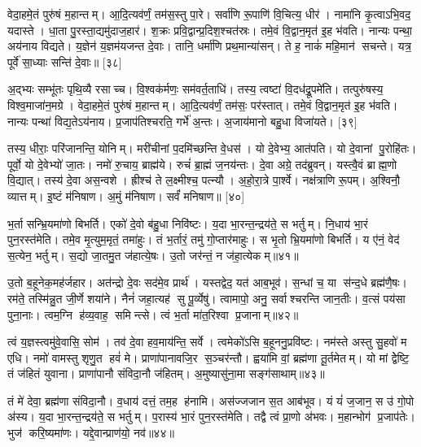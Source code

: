 वेदा॒हमे॒तं पुरु॑षं म॒हान्तम्। आ॒दि॒त्यव॑र्णं॒ तम॑स॒स्तु पा॒रे। सर्वा॑णि रू॒पाणि॑ वि॒चित्य॒ धीर॑। नामा॑नि कृ॒त्वाऽभि॒वद॒\an{} यदास्ते। धा॒ता पु॒रस्ता॒द्यमु॑दाज॒हार॑। श॒क्रः प्रवि॒द्वान्प्र॒दिश॒श्चत॑स्रः। तमे॒वं वि॒द्वान॒मृत॑ इ॒ह भ॑वति। नान्यः पन्था॒ अय॑नाय विद्यते। य॒ज्ञेन॑ य॒ज्ञम॑यजन्त दे॒वाः। तानि॒ धर्मा॑णि प्रथ॒मान्या॑सन्। ते ह॒ नाकं॑ महि॒मान॑ सचन्ते। यत्र॒ पूर्वे॑ सा॒ध्याः सन्ति॑ दे॒वाः॥ [३८]

अ॒द्भ्यः सम्भू॑तः पृथि॒व्यै रसाच्च। वि॒श्वक॑र्मणः॒ सम॑वर्त॒ताधि॑। तस्य॒ त्वष्टा॑ वि॒दध॑द्रू॒पमे॑ति। तत्पुरु॑षस्य॒ विश्व॒माजा॑न॒मग्रे। वेदा॒हमे॒तं पुरु॑षं म॒हान्तम्। आ॒दि॒त्यव॑र्णं॒ तम॑सः॒ पर॑स्तात्। तमे॒वं वि॒द्वान॒मृत॑ इ॒ह भ॑वति। नान्यः पन्था॑ विद्य॒तेऽय॑नाय। प्र॒जाप॑तिश्चरति॒ गर्भे॑ अ॒न्तः। अ॒जाय॑मानो बहु॒धा विजा॑यते। [३९]

तस्य॒ धीराः॒ परि॑जानन्ति॒ योनिम्। मरी॑चीनां प॒दमि॑च्छन्ति वे॒धस॑। यो दे॒वेभ्य॒ आत॑पति। यो दे॒वानां पु॒रोहि॑तः। पूर्वो॒ यो दे॒वेभ्यो॑ जा॒तः। नमो॑ रु॒चाय॒ ब्राह्म॑ये। रुचं॑ ब्रा॒ह्मं ज॒नय॑न्तः। दे॒वा अग्रे॒ तद॑ब्रुवन्। यस्त्वै॒वं ब्राह्म॒णो वि॒द्यात्। तस्य॑ दे॒वा अस॒न्वशे। ह्रीश्च॑ ते ल॒क्ष्मीश्च॒ पत्न्यौ। अ॒हो॒रा॒त्रे पा॒र्श्वे। नक्ष॑त्राणि रू॒पम्। अ॒श्विनौ॒ व्यात्तम्। इ॒ष्टं म॑निषाण। अ॒मुं म॑निषाण। सर्वं॑ मनिषाण॥ [४०]
\anuvakamend[जा॒य॒ते॒ वशे॑ स॒प्त च॑]

भ॒र्ता सन्भ्रि॒यमा॑णो बिभर्ति। एको॑ दे॒वो ब॑हु॒धा निवि॑ष्टः। य॒दा भा॒रन्त॒न्द्रय॑ते॒ स भर्तुम्। नि॒धाय॑ भा॒रं पुन॒रस्त॑मेति। तमे॒व मृ॒त्युम॒मृतं॒ तमा॑हुः। तं भ॒र्तारं॒ तमु॑ गो॒प्तार॑माहुः। स भृ॒तो भ्रि॒यमा॑णो बिभर्ति। य ए॑नं॒ वेद॑ स॒त्येन॒ भर्तुम्। स॒द्यो जा॒तमु॒त ज॑हात्ये॒षः। उ॒तो जर॑न्तं॒ न ज॑हा॒त्येकम्॥४१॥

उ॒तो ब॒हूनेक॒मह॑र्जहार। अत॑न्द्रो दे॒वः सद॑मे॒व प्रार्थ॑। यस्तद्वेद॒ यत॑ आब॒भूव॑। स॒न्धां च॒ या स॑न्द॒धे ब्रह्म॑णै॒षः। रम॑ते॒ तस्मि॑न्नु॒त जी॒र्णे शया॑ने। नैनं॑ जहा॒त्यह॑ सु पू॒र्व्येषु॑। त्वामापो॒ अनु॒ सर्वाश्चरन्ति जान॒तीः। व॒त्सं पय॑सा पुना॒नाः। त्वम॒ग्नि ह॑व्य॒वाह॒ समिन्त्से। त्वं भ॒र्ता मा॑त॒रिश्वा प्र॒जानाम्॥४२॥

त्वं य॒ज्ञस्त्वमु॑वे॒वासि॒ सोम॑। तव॑ दे॒वा हव॒माय॑न्ति॒ सर्वे। त्वमेको॑ऽसि ब॒हूननु॒प्रवि॑ष्टः। नम॑स्ते अस्तु सु॒हवो॑ म एधि। नमो॑ वामस्तु शृणु॒त हवं॑ मे। प्राणा॑पानावजि॒र स॒ञ्चर॑न्तौ। ह्वया॑मि वां॒ ब्रह्म॑णा तू॒र्तमेतम्। यो मां द्वेेष्टि॒ तं ज॑हितं युवाना। प्राणा॑पानौ संविदा॒नौ ज॑हितम्। अ॒मुष्यासु॑ना॒मा सङ्ग॑साथाम्॥४३॥

तं मे॑ देवा॒ ब्रह्म॑णा संविदा॒नौ। व॒धाय॑ दत्तं॒ तम॒ह ह॑नामि। अस॑ज्जजान स॒त आब॑भूव। यं यं॑ ज॒जान॒ स उ॑ गो॒पो अ॑स्य। य॒दा भा॒रन्त॒न्द्रय॑ते॒ स भर्तुम्। प॒रास्य॑ भा॒रं पुन॒रस्त॑मेति। तद्वै त्वं प्रा॒णो अ॑भवः। म॒हान्भोग॑ प्र॒जाप॑तेः। भुज॑ करि॒ष्यमा॑णः। यद्दे॒वान्प्राण॑यो॒ नव॑॥४४॥
\anuvakamend[एकं॑ प्र॒जानाङ्गसाथां॒ नव॑]

